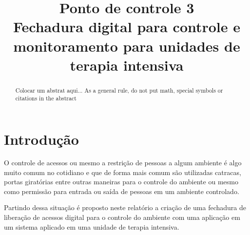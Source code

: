 \documentclass[conference,compsoc]{IEEEtran}
\begin{document}
\title{Ponto de controle 3\\Fechadura digital para controle e monitoramento para unidades de terapia intensiva}



\author{
\and
{}
}

\maketitle

\begin{abstract}
Colocar um abstrat aqui...
As a general rule, do not put math, special symbols or citations
in the abstract
\end{abstract}

\IEEEpeerreviewmaketitle



\section{Introdução}

O controle de acessos ou mesmo a restrição de pessoas a algum ambiente é algo muito comum no cotidiano e que de forma mais comum são utilizadas catracas, portas giratórias entre outras maneiras para o controle do ambiente ou mesmo como permissão para entrada ou saída de pessoas em um ambiente controlado.

Partindo dessa situação é proposto neste relatório a criação de uma fechadura de liberação de acessos digital para o controle do ambiente com uma aplicação em um sistema aplicado em uma unidade de terapia intensiva.
\end{document}
